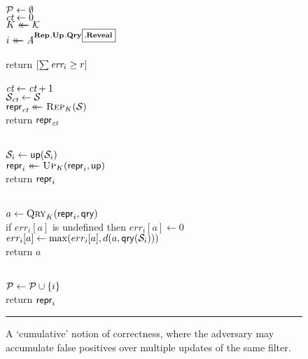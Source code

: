 \begin{figure}[t]
  {
     \\[2pt]
      $\mathcal{P} \gets \emptyset$\\
      $\textit{ct} \gets 0$ \\
      $K \mathrel{\leftarrow\mkern-14mu\leftarrow} \mathcal{K}$\\
      $i \mathrel{\leftarrow\mkern-14mu\leftarrow} \mathit{A}^{\mathbf{Rep}\hspace{0.5pt},\mathbf{Up}\hspace{0.5pt},\mathbf{Qry}\hspace{0.5pt}{\scriptsize\boxed{\!,\!\mathbf{Reveal}}}}$\\
       \\
      return $[\sum \textit{err}_i \geq r]$ 
    \\[6pt]
    \oraclev{$\REPO(\col)$}\\[2pt]
      $\textit{ct}\gets\textit{ct}+1$ \\
      $\mathcal{S}_{\textit{ct}} \gets \mathcal{S}$\\
      $\mathsf{repr}_{\textit{ct}} \mathrel{\leftarrow\mkern-14mu\leftarrow} \textsc{Rep}_K(\mathcal{S})$\\
      return $\mathsf{repr}_{\textit{ct}}$   }
  {
    \\[2pt]
      $\mathcal{S}_i \gets \mathsf{up}(\mathcal{S}_i)$\\
      $\mathsf{repr}_i \mathrel{\leftarrow\mkern-14mu\leftarrow} \textsc{Up}_K(\mathsf{repr}_i, \mathsf{up})$\\
      return $\mathsf{repr}_i$ 
      \medskip

    \\[2pt]
      $a \gets \textsc{Qry}_K(\mathsf{repr}_i, \mathsf{qry})$\\
      if $err_i[a]$ is undefined then $err_i[a] \gets 0$ \\
      $err_i[a] \gets \mathrm{max}(err_i[a],d(a,\mathsf{qry}(\mathcal{S}_i)))$\\
      return $a$
      \medskip

    \\[2pt]
     $\mathcal{P} \gets \mathcal{P} \cup \{i\}$ \\
      return $\mathsf{repr}_i$
  }
  \caption{A `cumulative' notion of correctness, where the adversary may accumulate false positives over multiple updates of the same filter.}
  \vspace{6pt}\hrule
  \label{fig:security}
\end{figure}

